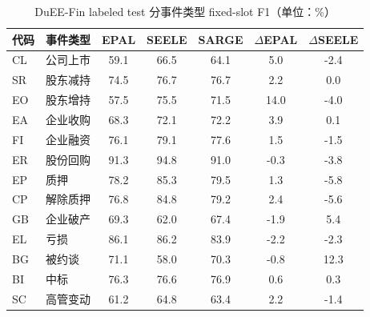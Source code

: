 \begin{table}[htbp]
\centering
\caption{DuEE-Fin labeled test 分事件类型 fixed-slot F1（单位：\%）}
\label{tab:dueefin-events}
\small
\begin{tabular}{llSSSSS}
\toprule
代码 & 事件类型 & {EPAL} & {SEELE} & {SARGE} & {$\Delta$EPAL} & {$\Delta$SEELE} \\
\midrule
CL & 公司上市 & 59.1 & 66.5 & 64.1 & 5.0 & -2.4 \\
SR & 股东减持 & 74.5 & 76.7 & 76.7 & 2.2 & 0.0 \\
EO & 股东增持 & 57.5 & 75.5 & 71.5 & 14.0 & -4.0 \\
EA & 企业收购 & 68.3 & 72.1 & 72.2 & 3.9 & 0.1 \\
FI & 企业融资 & 76.1 & 79.1 & 77.6 & 1.5 & -1.5 \\
ER & 股份回购 & 91.3 & 94.8 & 91.0 & -0.3 & -3.8 \\
EP & 质押 & 78.2 & 85.3 & 79.5 & 1.3 & -5.8 \\
CP & 解除质押 & 76.8 & 84.8 & 79.2 & 2.4 & -5.6 \\
GB & 企业破产 & 69.3 & 62.0 & 67.4 & -1.9 & 5.4 \\
EL & 亏损 & 86.1 & 86.2 & 83.9 & -2.2 & -2.3 \\
BG & 被约谈 & 71.1 & 58.0 & 70.3 & -0.8 & 12.3 \\
BI & 中标 & 76.3 & 76.6 & 76.9 & 0.6 & 0.3 \\
SC & 高管变动 & 61.2 & 64.8 & 63.4 & 2.2 & -1.4 \\
\bottomrule
\end{tabular}
\end{table}
